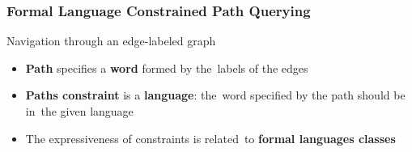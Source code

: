 \documentclass[xcolor=table,aspectratio=169]{beamer}
\begin{document}
\begin{frame}[fragile] \frametitle{Formal Language Constrained Path Querying}
      \begin{minipage}[m]{0.45\linewidth}
  \end{minipage}\hfill
  \begin{minipage}[m]{0.5\linewidth}
  Navigation through an edge-labeled graph

  \vfill

  \begin{itemize}
        \item \textbf{Path} specifies a \textbf{word} formed by the~labels of the edges
        \item \textbf{Paths constraint} is a \textbf{language}: the~word specified by the path should be in~the given language
        \item The expressiveness of constraints is related~to \textbf{formal languages classes}
  \end{itemize}

  \end{minipage}

\end{frame}
\end{document}
